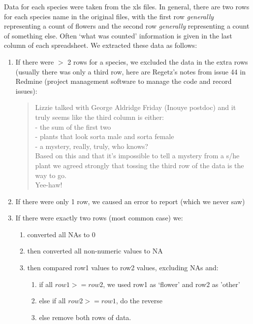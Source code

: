 \documentclass[11pt,a4paper]{article}
\begin{document}
Data for each species were taken from the xls files. In general, there are two rows for each species name in the original files, with the first row \emph{generally} representing a count of flowers and the second row \emph{generally} representing a count of something else. Often `what was counted' information is given in the last column of each spreadsheet. We extracted these data as follows:
\begin{enumerate}
\item If there were \(>\) 2 rows for a species, we excluded the data
  in the extra rows (usually there was only a third row, here are Regetz's
  notes from issue 44 in Redmine (project management software to manage the code and record issues):
\begin{quote} 
Lizzie talked with George Aldridge Friday (Inouye postdoc) and it truly seems like the third column is either:\\
- the sum of the first two\\
- plants that look sorta male and sorta female\\
- a mystery, really, truly, who knows?\\
Based on this and that it's impossible to tell a mystery from a s/he plant we agreed strongly that tossing the third row of the data is the way to go.\\
Yee-haw!
\end{quote}
\item If there were only 1 row, we caused an error to report (which we never saw)
\item If there were exactly two rows (most common case) we:
\begin{enumerate}
\item converted all NAs to 0
\item then converted all non-numeric values to NA
\item then compared row1 values to row2 values, excluding NAs and:
\begin{enumerate}
\item if all \(row1>=row2\), we used row1 as `flower' and row2 as 'other'
\item else if all \(row2>=row1\), do the reverse
\item else remove both rows of data.
\end{enumerate}
\end{enumerate}
\end{enumerate}
\end{document}
